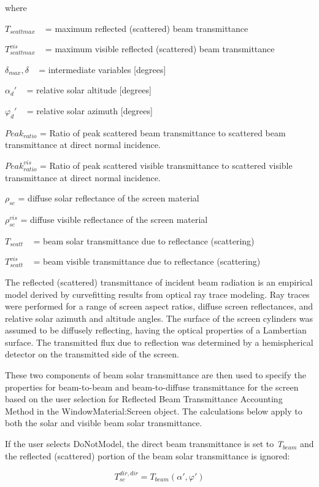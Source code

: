 where

\({T_{scattmax}}\) ~ = maximum reflected (scattered) beam transmittance

\(T_{scattmax}^{vis}\) ~ = maximum visible reflected (scattered) beam transmittance

\({\delta_{max}},\delta\) ~ = intermediate variables {[}degrees{]}

\(\alpha_d'\) ~ = relative solar altitude {[}degrees{]}

\(\varphi_d'\) ~ = relative solar azimuth {[}degrees{]}

\(Pea{k_{ratio}}\) = Ratio of peak scattered beam transmittance to scattered beam transmittance at direct normal incidence.

\(Peak_{ratio}^{vis}\) = Ratio of peak scattered visible transmittance to scattered visible transmittance at direct normal incidence.

\({\rho_{sc}}\) = diffuse solar reflectance of the screen material

\(\rho_{sc}^{vis}\) = diffuse visible reflectance of the screen material

\({T_{scatt}}\) ~ = beam solar transmittance due to reflectance (scattering)

\(T_{scatt}^{vis}\) ~ = beam visible transmittance due to reflectance (scattering)

The reflected (scattered) transmittance of incident beam radiation is an empirical model derived by curvefitting results from optical ray trace modeling. Ray traces were performed for a range of screen aspect ratios, diffuse screen reflectances, and relative solar azimuth and altitude angles. The surface of the screen cylinders was assumed to be diffusely reflecting, having the optical properties of a Lambertian surface. The transmitted flux due to reflection was determined by a hemispherical detector on the transmitted side of the screen.

These two components of beam solar transmittance are then used to specify the properties for beam-to-beam and beam-to-diffuse transmittance for the screen based on the user selection for Reflected Beam Transmittance Accounting Method in the WindowMaterial:Screen object. The calculations below apply to both the solar and visible beam solar transmittance.

If the user selects DoNotModel, the direct beam transmittance is set to \emph{T\(_{beam}\)} and the reflected (scattered) portion of the beam solar transmittance is ignored:

\begin{equation}
T_{sc}^{dir,dir} = {T_{beam}}\left( {\alpha ',\varphi '} \right)
\end{equation}

